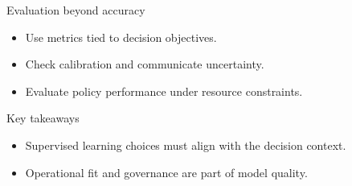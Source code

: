 \documentclass[aspectratio=169,11pt]{beamer}
\begin{document}
\begin{frame}{Evaluation beyond accuracy}
  \begin{itemize}
    \item Use metrics tied to decision objectives.
    \item Check calibration and communicate uncertainty.
    \item Evaluate policy performance under resource constraints.
  \end{itemize}
\end{frame}


\begin{frame}{Key takeaways}
  \begin{itemize}
    \item Supervised learning choices must align with the decision context.
    \item Operational fit and governance are part of model quality.
  \end{itemize}
\end{frame}
\end{document}
